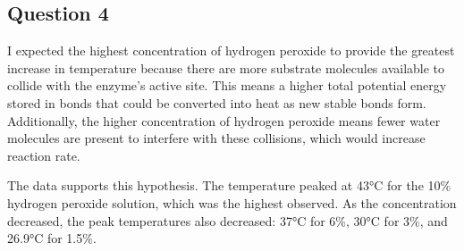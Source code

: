 \documentclass[12pt]{article}
\begin{document}
\subsection*{Question 4}
\begin{enumAlph}
    \item I expected the highest concentration of hydrogen peroxide to provide the greatest increase in temperature because there are more substrate molecules available to collide with the enzyme's active site. This means a higher total potential energy stored in bonds that could be converted into heat as new stable bonds form. Additionally, the higher concentration of hydrogen peroxide means fewer water molecules are present to interfere with these collisions, 
    which would increase reaction rate.

    \item The data supports this hypothesis. The temperature peaked at 43°C for the 10\% hydrogen peroxide solution, which was the highest observed. As the concentration decreased, the peak temperatures also decreased: 37°C for 6\%, 30°C for 3\%, and 26.9°C for 1.5\%. 

    
\end{enumAlph}
\end{document}
